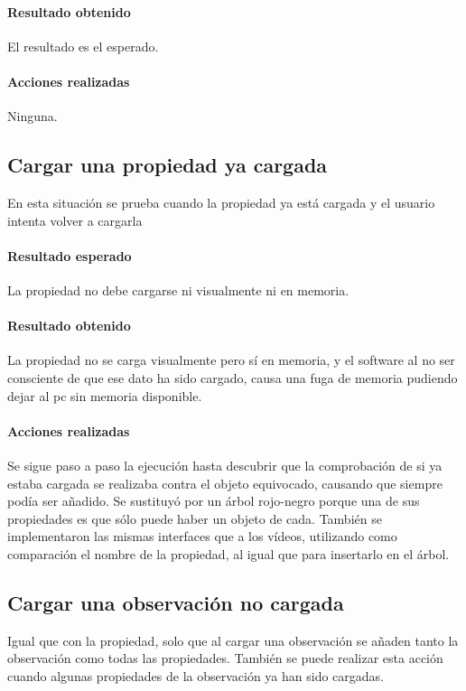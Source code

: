 \paragraph{Resultado obtenido}
El resultado es el esperado.

\paragraph{Acciones realizadas}
Ninguna.

\subsection{Cargar una propiedad ya cargada}
En esta situaci\'on se prueba cuando la propiedad
ya est\'a cargada y el usuario intenta volver a cargarla

\paragraph{Resultado esperado}
La propiedad no debe cargarse ni visualmente ni en memoria.

\paragraph{Resultado obtenido}
La propiedad no se carga visualmente pero s\'i en memoria, y el software
al no ser consciente de que ese dato ha sido cargado, causa una fuga de memoria
pudiendo dejar al pc sin memoria disponible.

\paragraph{Acciones realizadas}
Se sigue paso a paso la ejecuci\'on hasta descubrir que la comprobaci\'on
de si ya estaba cargada se realizaba contra el objeto equivocado, causando que
siempre pod\'ia ser a\~nadido. Se sustituy\'o por un \'arbol rojo-negro
porque una de sus propiedades es que s\'olo puede haber un objeto de cada.
Tambi\'en se implementaron las mismas interfaces que a los v\'ideos, utilizando
como comparaci\'on el nombre de la propiedad, al igual que para insertarlo
en el \'arbol.

\subsection{Cargar una observaci\'on no cargada}
Igual que con la propiedad, solo que al cargar una observaci\'on
se a\~naden tanto la observaci\'on como todas las propiedades. Tambi\'en
se puede realizar esta acci\'on cuando algunas propiedades de la observaci\'on
ya han sido cargadas.

